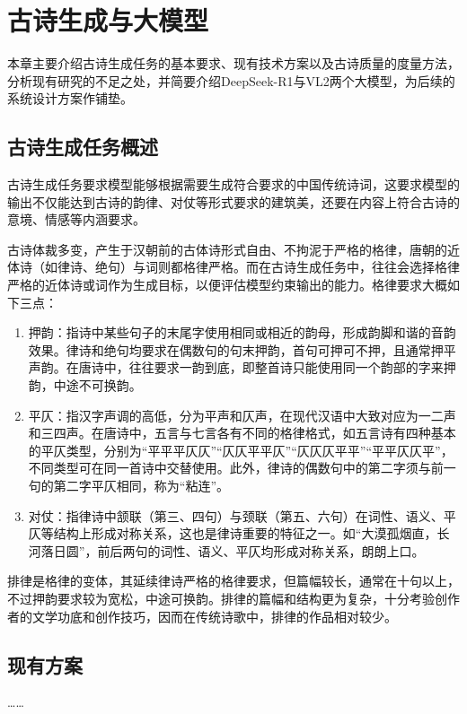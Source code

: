 
\chapter{古诗生成与大模型}

本章主要介绍古诗生成任务的基本要求、现有技术方案以及古诗质量的度量方法，分析现有研究的不足之处，并简要介绍DeepSeek-R1与VL2两个大模型，为后续的系统设计方案作铺垫。

\section{古诗生成任务概述}

古诗生成任务要求模型能够根据需要生成符合要求的中国传统诗词，这要求模型的输出不仅能达到古诗的韵律、对仗等形式要求的建筑美，还要在内容上符合古诗的意境、情感等内涵要求。

古诗体裁多变，产生于汉朝前的古体诗形式自由、不拘泥于严格的格律，唐朝的近体诗（如律诗、绝句）与词则都格律严格。而在古诗生成任务中，往往会选择格律严格的近体诗或词作为生成目标，以便评估模型约束输出的能力。格律要求大概如下三点：

\begin{enumerate}
    \item 押韵：指诗中某些句子的末尾字使用相同或相近的韵母，形成韵脚和谐的音韵效果。律诗和绝句均要求在偶数句的句末押韵，首句可押可不押，且通常押平声韵。在唐诗中，往往要求一韵到底，即整首诗只能使用同一个韵部的字来押韵，中途不可换韵。
    \item 平仄：指汉字声调的高低，分为平声和仄声，在现代汉语中大致对应为一二声和三四声。在唐诗中，五言与七言各有不同的格律格式，如五言诗有四种基本的平仄类型，分别为“平平平仄仄”“仄仄平平仄”“仄仄仄平平”“平平仄仄平”，不同类型可在同一首诗中交替使用。此外，律诗的偶数句中的第二字须与前一句的第二字平仄相同，称为“粘连”。
    \item 对仗：指律诗中颔联（第三、四句）与颈联（第五、六句）在词性、语义、平仄等结构上形成对称关系，这也是律诗重要的特征之一。如“大漠孤烟直，长河落日圆”，前后两句的词性、语义、平仄均形成对称关系，朗朗上口。
\end{enumerate}

排律是格律的变体，其延续律诗严格的格律要求，但篇幅较长，通常在十句以上，不过押韵要求较为宽松，中途可换韵。排律的篇幅和结构更为复杂，十分考验创作者的文学功底和创作技巧，因而在传统诗歌中，排律的作品相对较少。

\section{现有方案}
……

